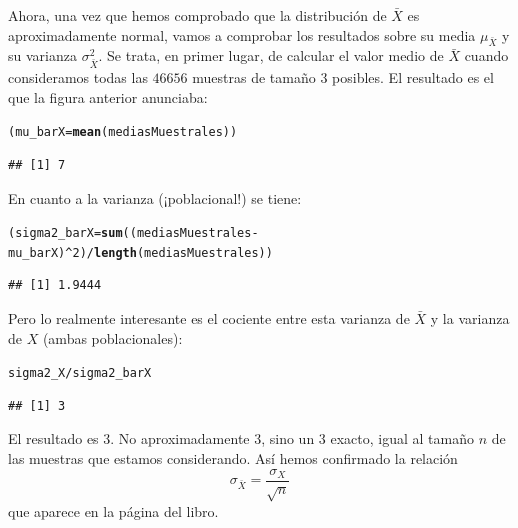 \documentclass[10pt,a4paper]{article}\usepackage[]{graphicx}\usepackage[]{color}
\makeatletter
\newcommand{\hlnum}[1]{\textcolor[rgb]{0.686,0.059,0.569}{#1}}%
\newcommand{\hlopt}[1]{\textcolor[rgb]{0,0,0}{#1}}%
\newcommand{\hlstd}[1]{\textcolor[rgb]{0.345,0.345,0.345}{#1}}%
\newcommand{\hlkwb}[1]{\textcolor[rgb]{0.69,0.353,0.396}{#1}}%
\newcommand{\hlkwd}[1]{\textcolor[rgb]{0.737,0.353,0.396}{\textbf{#1}}}%
\newenvironment{kframe}{%
 \def\at@end@of@kframe{}%
 \ifinner\ifhmode%
  \def\at@end@of@kframe{\end{minipage}}%
  \begin{minipage}{\columnwidth}%
 \fi\fi%
 \def\FrameCommand##1{\hskip\@totalleftmargin \hskip-\fboxsep
 \colorbox{shadecolor}{##1}\hskip-\fboxsep
     \hskip-\linewidth \hskip-\@totalleftmargin \hskip\columnwidth}%
 \MakeFramed {\advance\hsize-\width
   \@totalleftmargin\z@ \linewidth\hsize
   \@setminipage}}%
 {\par\unskip\endMakeFramed%
 \at@end@of@kframe}
\newenvironment{knitrout}{}{} %
\makeatother
\begin{document}
Ahora, una vez que hemos comprobado que la distribución de $\bar X$ es aproximadamente normal, vamos a comprobar los resultados sobre su media $\mu_{\bar X}$ y su varianza $\sigma^2_{\bar X}$. Se trata, en primer lugar, de calcular el valor medio de $\bar X$ cuando consideramos todas las $46656$ muestras de tamaño $3$ posibles. El resultado es el que la figura anterior anunciaba:
\begin{knitrout}
\color{fgcolor}\begin{kframe}
\begin{alltt}
\hlstd{(mu_barX} \hlkwb{=} \hlkwd{mean}\hlstd{(mediasMuestrales))}
\end{alltt}
\begin{verbatim}
## [1] 7
\end{verbatim}
\end{kframe}
\end{knitrout}
En cuanto a la varianza (¡poblacional!) se tiene:
\begin{knitrout}
\color{fgcolor}\begin{kframe}
\begin{alltt}
\hlstd{(sigma2_barX} \hlkwb{=} \hlkwd{sum}\hlstd{((mediasMuestrales} \hlopt{-} \hlstd{mu_barX)}\hlopt{^}\hlnum{2}\hlstd{)} \hlopt{/} \hlkwd{length}\hlstd{(mediasMuestrales) )}
\end{alltt}
\begin{verbatim}
## [1] 1.9444
\end{verbatim}
\end{kframe}
\end{knitrout}
Pero lo realmente interesante es el cociente entre esta varianza de $\bar X$ y la varianza de $X$ (ambas poblacionales):
\begin{knitrout}
\color{fgcolor}\begin{kframe}
\begin{alltt}
\hlstd{sigma2_X} \hlopt{/} \hlstd{sigma2_barX}
\end{alltt}
\begin{verbatim}
## [1] 3
\end{verbatim}
\end{kframe}
\end{knitrout}
El resultado es $3$. No aproximadamente $3$, sino  un $3$ exacto, igual al tamaño $n$ de las muestras que estamos considerando. Así hemos confirmado la relación
\[\sigma_{\bar X}=\dfrac{\sigma_X}{\sqrt{n}}\]
que aparece en la página \pageref{curso-cap06:ecu:MediaMuestral} del libro.
\end{document}
